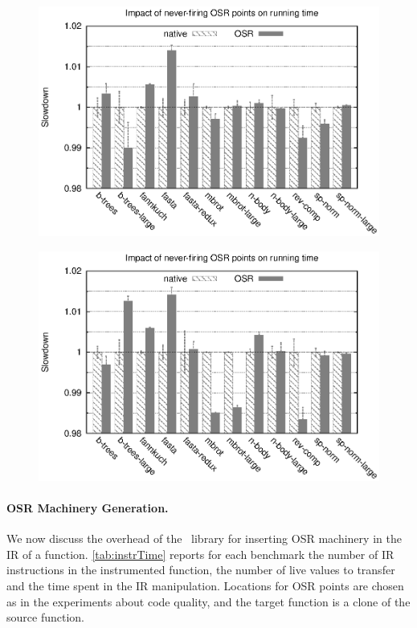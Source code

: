 \ifdefined\noauthorea
\begin{figure}[t]
\begin{center}
\includegraphics[width=0.95\columnwidth]{figures/code-quality-noBB/code-quality-noBB.eps}
\caption{\protect}
\end{center}
\end{figure}
\fi

\ifdefined\noauthorea
\begin{figure}[t]
\begin{center}
\includegraphics[width=0.95\columnwidth]{figures/code-quality-O1-noBB/code-quality-O1-noBB.eps}
\caption{\protect}
\end{center}
\end{figure}
\fi

\ifauthorea{\newline}{}
\paragraph{OSR Machinery Generation.}
We now discuss the overhead of the \osrkit\ library for inserting OSR machinery in the IR of a function. \mytable\ref{tab:instrTime} reports for each benchmark the number of IR instructions in the instrumented function, the number of live values to transfer and the time spent in the IR manipulation. Locations for OSR points are chosen as in the experiments about code quality, and the target function is a clone of the source function.

